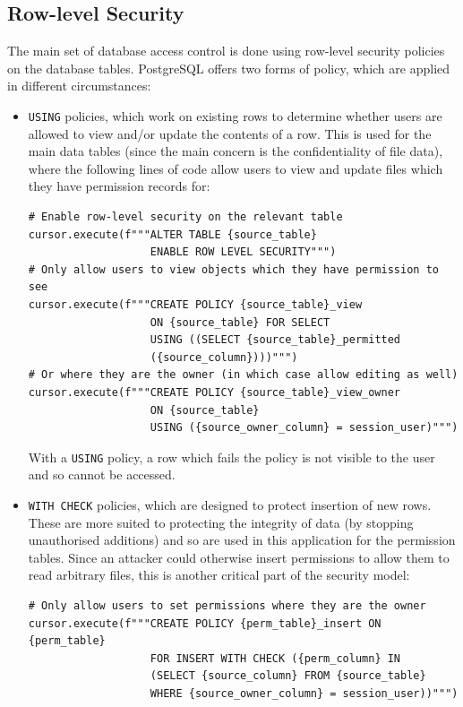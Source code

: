 \documentclass[12pt]{report}
\begin{document}
\subsection{Row-level Security}
The main set of database access control is done using row-level security policies on the database tables. PostgreSQL offers two forms of policy, which are applied in different circumstances\cite{postgres-policy}:
\begin{itemize}
\item
  \texttt{USING} policies, which work on existing rows to determine whether users are allowed to view and/or update the contents of a row. This is used for the main data tables (since the main concern is the confidentiality of file data), where the following lines of code allow users to view and update files which they have permission records for:

\begin{verbatim}
# Enable row-level security on the relevant table
cursor.execute(f"""ALTER TABLE {source_table}
                   ENABLE ROW LEVEL SECURITY""")
# Only allow users to view objects which they have permission to see
cursor.execute(f"""CREATE POLICY {source_table}_view
                   ON {source_table} FOR SELECT
                   USING ((SELECT {source_table}_permitted
                   ({source_column})))""")
# Or where they are the owner (in which case allow editing as well)
cursor.execute(f"""CREATE POLICY {source_table}_view_owner
                   ON {source_table}
                   USING ({source_owner_column} = session_user)""")
\end{verbatim}

  With a \texttt{USING} policy, a row which fails the policy is not visible to the user and so cannot be accessed.

\item
  \texttt{WITH CHECK} policies, which are designed to protect insertion of new rows. These are more suited to protecting the integrity of data (by stopping unauthorised additions) and so are used in this application for the permission tables. Since an attacker could otherwise insert permissions to allow them to read arbitrary files, this is another critical part of the security model:

\begin{verbatim}
# Only allow users to set permissions where they are the owner
cursor.execute(f"""CREATE POLICY {perm_table}_insert ON {perm_table}
                   FOR INSERT WITH CHECK ({perm_column} IN
                   (SELECT {source_column} FROM {source_table}
                   WHERE {source_owner_column} = session_user))""")
\end{verbatim}
\end{itemize}
\end{document}
